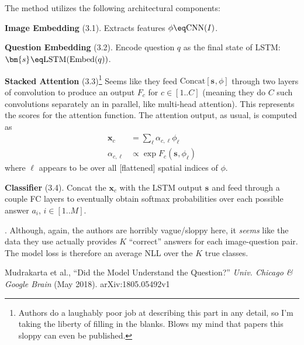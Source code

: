 \documentclass[11pt]{article}
\renewcommand\vec[2][]{\bm{#2}_{#1}}
\newcommand\myspace[1][]{\vspace{#1\bigskipamount}}
\newcommand\p{\Needspace{10\baselineskip} \noindent}
\newcommand\bluesec[1]{\myspace \p \blue{#1}}
\begin{document}
The method utilizes the following architectural components:
\begin{compactitem}
	\item \textbf{Image Embedding} (3.1). Extracts features $\phi \eq \text{CNN}(I)$. 
	
	\item \textbf{Question Embedding} (3.2). Encode question $q$ as the final state of LSTM: $\vec s \eq \text{LSTM}(\text{Embed}(q))$. 
	
	\item \textbf{Stacked Attention} (3.3)\footnote{Authors do a laughably poor job at describing this part in any detail, so I'm taking the liberty of filling in the blanks. Blows my mind that papers this sloppy can even be published.} Seems like they feed $\text{Concat}[\vec s, \phi]$ through two layers of convolution to produce an output $F_c$ for $c \in [1..C]$ (meaning they do $C$ such convolutions separately an in parallel, like multi-head attention). This represents the scores for the attention function. The attention output, as usual, is computed as 
	\begin{align}
		\vec[c]{x} &= \sum_{\ell} \alpha_{c, \ell} \phi_{\ell} \\
		\alpha_{c, \ell} &\propto \exp F_c(\vec s, \phi_{\ell})
	\end{align}
	where $\ell$ appears to be over all [flattened] spatial indices of $\phi$. 
	
	\item \textbf{Classifier} (3.4). Concat the  $\vec[c]{x}$ with the LSTM output $\vec s$ and feed through a couple FC layers to eventually obtain softmax probabilities over each possible answer $a_i$, $i \in [1..M]$. 
\end{compactitem}

\bluesec{Dataset}. Although, again, the authors are horribly vague/sloppy here, it \textit{seems} like the data they use actually provides $K$ ``correct'' answers for each image-question pair. The model loss is therefore an average NLL over the $K$ true classes. 









\vspace{-1em}
{\footnotesize Mudrakarta et al., ``Did the Model Understand the Question?'' \textit{Univ. Chicago \& Google Brain} (May 2018).  arXiv:1805.05492v1}
\end{document}
